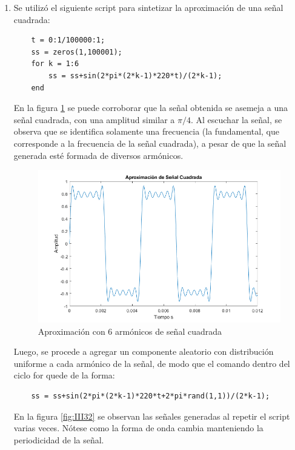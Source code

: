 \documentclass[letterpaper,onecolumn,10pt,journal,final]{IEEEtran}
\begin{document}
\begin{enumerate}[{1)}]
    \item 
    Se utilizó el siguiente script para sintetizar la aproximación de una señal cuadrada:
    \begin{lstlisting}
    t = 0:1/100000:1;
    ss = zeros(1,100001);
    for k = 1:6
        ss = ss+sin(2*pi*(2*k-1)*220*t)/(2*k-1);
    end
    \end{lstlisting}
    En la figura \ref{fig:III3} se puede corroborar que la señal obtenida se asemeja a una señal cuadrada, con una amplitud similar a $\pi/4$.
    Al escuchar la señal, se observa que se identifica solamente una frecuencia (la fundamental, que corresponde a la frecuencia de la señal cuadrada), a pesar de que la señal generada esté formada de diversos armónicos. 
    \begin{figure}[H]
        \centering
        \includegraphics[width=0.7 \linewidth]{Figuras/PlotIIIc.png}
        \caption{Aproximación con 6 armónicos de señal cuadrada}
        \label{fig:III3}
    \end{figure}
    Luego, se procede a agregar un componente aleatorio con distribución uniforme a cada armónico de la señal, de modo que el comando dentro del ciclo for quede de la forma:
    \begin{lstlisting}
    ss = ss+sin(2*pi*(2*k-1)*220*t+2*pi*rand(1,1))/(2*k-1);
    \end{lstlisting}
    En la figura \ref{fig:III32} se observan las señales generadas al repetir el script varias veces. Nótese como la forma de onda cambia manteniendo la periodicidad de la señal. 
    

\end{enumerate}
\end{document}
